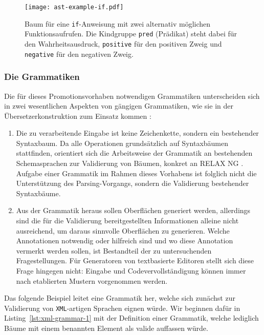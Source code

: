 \documentclass[paper=a4,fontsize=11pt,parskip=half]{scrartcl}
\begin{document}
\begin{figure}[p]
  \centering\texttt{[image: ast-example-if.pdf]}
  \caption{Baum für eine \texttt{if}-Anweisung mit zwei alternativ möglichen Funktionsaufrufen. Die Kindgruppe \texttt{pred} (Prädikat) steht dabei für den Wahrheitsausdruck, \texttt{positive} für den positiven Zweig und \texttt{negative} für den negativen Zweig.}
  \label{fig:ast-example-if}
\end{figure}

\subsubsection{Die Grammatiken}
\label{sec:grammars}

Die für dieses Promotionsvorhaben notwendigen Grammatiken unterscheiden sich in zwei wesentlichen Aspekten von gängigen Grammatiken, wie sie in der Übersetzerkonstruktion zum Einsatz kommen \cite[S. 42ff]{aho_compilers:_2007}:

\begin{enumerate}
\item Die zu verarbeitende Eingabe ist keine Zeichenkette, sondern ein bestehender Syntaxbaum. Da alle Operationen grundsätzlich auf Syntaxbäumen stattfinden, orientiert sich die Arbeitsweise der Grammatik an bestehenden Schemasprachen zur Validierung von Bäumen, konkret an RELAX NG \cite{clark_relax_2001}. Aufgabe einer Grammatik im Rahmen dieses Vorhabens ist folglich nicht die Unterstützung des Parsing-Vorgangs, sondern die Validierung bestehender Syntaxbäume.
\item Aus der Grammatik heraus sollen Oberflächen generiert werden, allerdings sind die für die Validierung bereitgestellten Informationen alleine nicht ausreichend, um daraus sinnvolle Oberflächen zu generieren. Welche Annotationen notwendig oder hilfreich sind und wo diese Annotation vermerkt werden sollen, ist Bestandteil der zu untersuchenden Fragestellungen. Für Generatoren von textbasierte Editoren stellt sich diese Frage hingegen nicht: Eingabe und Codevervollständigung können immer nach etablierten Mustern vorgenommen werden.
\end{enumerate}

Das folgende Beispiel leitet eine Grammatik her, welche sich zunächst zur Validierung von \texttt{XML}-artigen Sprachen eignen würde. Wir beginnen dafür in Listing~\ref{lst:xml-grammar-1} mit der Definition einer Grammatik, welche lediglich Bäume mit einem benannten Element als valide auffassen würde.
\end{document}
